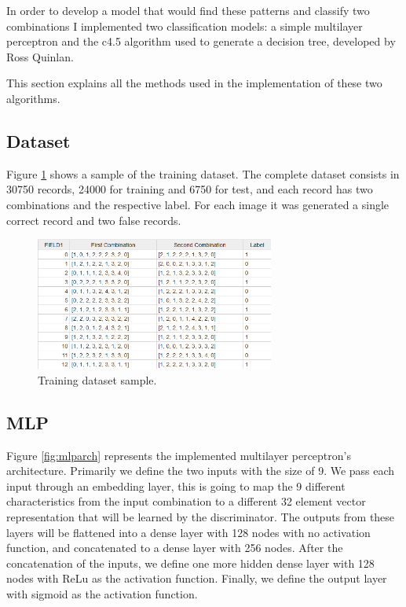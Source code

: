 \documentclass[12pt,a4paper,oneside]{memoir}
\begin{document}
\par

In order to develop a model that would find these patterns and classify two combinations I implemented two classification models: a simple multilayer perceptron and the c4.5 algorithm used to generate a decision tree, developed by Ross Quinlan. 

\par

This section explains all the methods used in the implementation of these two algorithms.

\subsection{Dataset}
Figure \ref{fig:class} shows a sample of the training dataset. The complete dataset consists in 30750 records, 24000 for training and 6750 for test, and each record has two combinations and the respective label. For each image it was generated a single correct record and two false records. 



\begin{figure}[H]
\centering
\includegraphics[width=0.7\textwidth]{images/dataset.png}
\caption{Training dataset sample.}
\centering
\label{fig:class}
\end{figure}



\subsection{\ac{MLP}}
\label{sec:mlp} 
Figure \ref{fig:mlparch} represents the implemented multilayer perceptron's architecture. Primarily we define the two inputs with the size of 9. We pass each input through an embedding layer, this is going to map the 9 different characteristics from the input combination to a different 32 element vector representation that will be learned by the discriminator. The outputs from these layers will be flattened into a dense layer with 128 nodes with no activation function, and concatenated to a dense layer with 256 nodes. After the concatenation of the inputs, we define one more hidden dense layer with 128 nodes with ReLu as the activation function. Finally, we define the output layer with sigmoid as the activation function.
\end{document}
